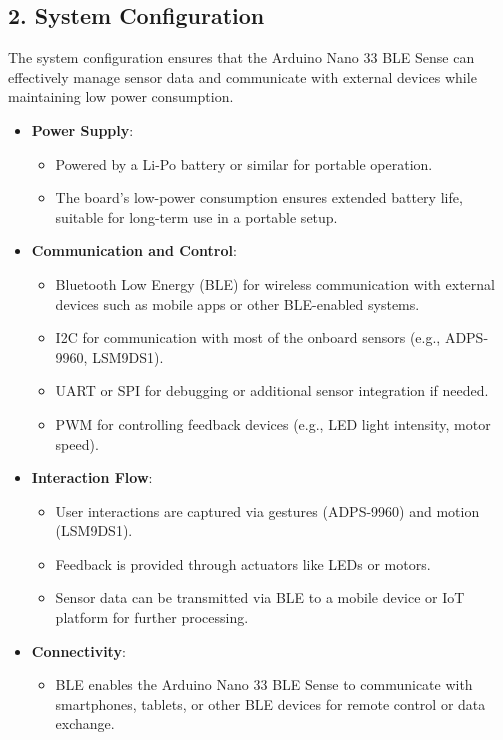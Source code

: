 	\subsection*{2. System Configuration}
	
	The system configuration ensures that the Arduino Nano 33 BLE Sense can effectively manage sensor data and communicate with external devices while maintaining low power consumption.
	
	\begin{itemize}
		\item \textbf{Power Supply}: 
		\begin{itemize}
			\item Powered by a Li-Po battery or similar for portable operation. 
			\item The board’s low-power consumption ensures extended battery life, suitable for long-term use in a portable setup.
		\end{itemize}
		\item \textbf{Communication and Control}: 
		\begin{itemize}
			\item Bluetooth Low Energy (BLE) for wireless communication with external devices such as mobile apps or other BLE-enabled systems.
			\item I2C for communication with most of the onboard sensors (e.g., ADPS-9960, LSM9DS1).
			\item UART or SPI for debugging or additional sensor integration if needed.
			\item PWM for controlling feedback devices (e.g., LED light intensity, motor speed).
		\end{itemize}
		\item \textbf{Interaction Flow}: 
		\begin{itemize}
			\item User interactions are captured via gestures (ADPS-9960) and motion (LSM9DS1).
			\item Feedback is provided through actuators like LEDs or motors.
			\item Sensor data can be transmitted via BLE to a mobile device or IoT platform for further processing.
		\end{itemize}
		\item \textbf{Connectivity}: 
		\begin{itemize}
			\item BLE enables the Arduino Nano 33 BLE Sense to communicate with smartphones, tablets, or other BLE devices for remote control or data exchange.
		\end{itemize}
	\end{itemize}

